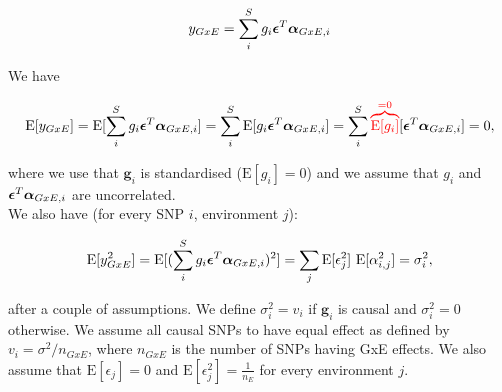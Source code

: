 \begin{align}
    y_{GxE} = \sum_i^S g_i \boldsymbol{\epsilon}^T\boldsymbol{\alpha}_{GxE,i}
\end{align}

We have

\begin{align}
    \mathrm{E}[y_{GxE}] = \mathrm{E}[\sum_i^S g_i \boldsymbol{\epsilon}^T\boldsymbol{\alpha}_{GxE,i}] =  \sum_i^S \mathrm{E}[g_i \boldsymbol{\epsilon}^T\boldsymbol{\alpha}_{GxE,i}] = \sum_i^S \textcolor{red}{\overbrace{\mathrm{E}[g_i]}^{=0}} [\boldsymbol{\epsilon}^T\boldsymbol{\alpha}_{GxE,i}] = 0,
\end{align}

where we use that $\mathbf{g}_i$ is standardised ($\mathrm{E}[g_i]=0$) and we assume that $g_i$ and $\boldsymbol{\epsilon}^T\boldsymbol{\alpha}_{GxE,i}$ are uncorrelated. \\


We also have (for every SNP $i$, environment $j$):

\begin{align}
    \mathrm{E}[y_{GxE}^2] =  \mathrm{E}[(\sum_i^S g_i \boldsymbol{\epsilon}^T\boldsymbol{\alpha}_{GxE,i})^2] = \sum_j \mathrm{E}[\epsilon_j^2] \ \mathrm{E}[\alpha_{i,j}^2] = \sigma_i^2 ,
\end{align}

after a couple of assumptions.
We define $\sigma_i^2=v_i$ if $\mathbf{g}_i$ is causal and $\sigma_i^2=0$ otherwise.
We assume all causal SNPs to have equal effect as defined by $v_i=\sigma^2/n_{GxE}$, where $n_{GxE}$ is the number of SNPs having GxE effects.
We also assume that $\mathrm{E}[\epsilon_j]=0$ and $\mathrm{E}[\epsilon_j^2]=\frac{1}{n_E}$ for every environment $j$. \\